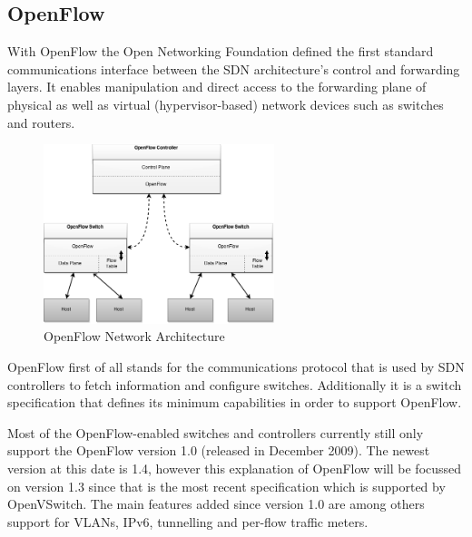 \subsection{OpenFlow}


With OpenFlow the Open Networking Foundation defined the first standard communications interface between the SDN architecture's control and forwarding layers. It enables manipulation and direct access to the forwarding plane of physical as well as virtual (hypervisor-based) network devices such as switches and routers.

\begin{figure}[H]
\centering

\includegraphics[width=0.6\textwidth]{images/fundamentals/openflow_architecture.png}

\caption{OpenFlow Network Architecture}
\end{figure}

OpenFlow first of all stands for the communications protocol that is used by SDN controllers to fetch information and configure switches. Additionally it is a switch specification that defines its minimum capabilities in order to support OpenFlow.


Most of the OpenFlow-enabled switches and controllers currently still only support the OpenFlow version 1.0 (released in December 2009). The newest version at this date is 1.4, however this explanation of OpenFlow will be focussed on version 1.3 since that is the most recent specification which is supported by OpenVSwitch.
The main features added since version 1.0 are among others support for VLANs, IPv6, tunnelling and per-flow traffic meters.

